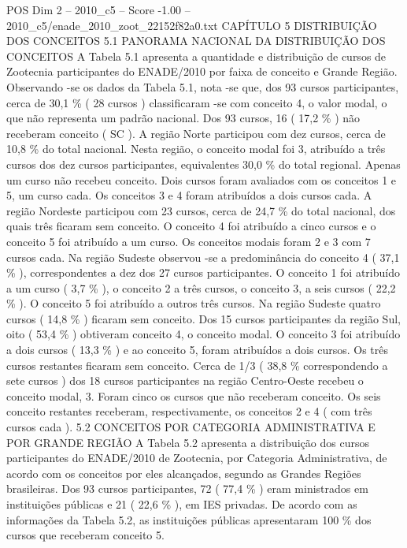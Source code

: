 \begin{textsample}{POS Dim 2 – 2010\_c5 – Score -1.00 – 2010\_c5/enade\_2010\_zoot\_22152f82a0.txt}  \label{ex:f2_pos_327}
CAPÍTULO 5 DISTRIBUIÇÃO DOS CONCEITOS 5.1 PANORAMA NACIONAL DA DISTRIBUIÇÃO DOS CONCEITOS A Tabela 5.1 apresenta a quantidade e distribuição de cursos de Zootecnia participantes do ENADE/2010 por faixa de conceito e Grande Região.
Observando -se os dados da Tabela 5.1, nota -se que, dos 93 cursos participantes, cerca de 30,1 \% ( 28 cursos ) classificaram -se com conceito 4, o valor modal, o que não representa um padrão nacional.
Dos 93 cursos, 16 ( 17,2 \% ) não receberam conceito ( SC ).
A região Norte participou com dez cursos, cerca de 10,8 \% do total nacional.
Nesta região, o conceito modal foi 3, atribuído a três cursos dos dez cursos participantes, equivalentes 30,0 \% do total regional.
Apenas um curso não recebeu conceito.
Dois cursos foram avaliados com os conceitos 1 e 5, um curso cada.
Os conceitos 3 e 4 foram atribuídos a dois cursos cada.
A região Nordeste participou com 23 cursos, cerca de 24,7 \% do total nacional, dos quais três ficaram sem conceito.
O conceito 4 foi atribuído a cinco cursos e o conceito 5 foi atribuído a um curso.
Os conceitos modais foram 2 e 3 com 7 cursos cada.
Na região Sudeste observou -se a predominância do conceito 4 ( 37,1 \% ), correspondentes a dez dos 27 cursos participantes.
O conceito 1 foi atribuído a um curso ( 3,7 \% ), o conceito 2 a três cursos, o conceito 3, a seis cursos ( 22,2 \% ).
O conceito 5 foi atribuído a outros três cursos.
Na região Sudeste quatro cursos ( 14,8 \% ) ficaram sem conceito.
Dos 15 cursos participantes da região Sul, oito ( 53,4 \% ) obtiveram conceito 4, o conceito modal.
O conceito 3 foi atribuído a dois cursos ( 13,3 \% ) e ao conceito 5, foram atribuídos a dois cursos.
Os três cursos restantes ficaram sem conceito.
Cerca de 1/3 ( 38,8 \% correspondendo a sete cursos ) dos 18 cursos participantes na região Centro-Oeste recebeu o conceito modal, 3.
Foram cinco os cursos que não receberam conceito.
Os seis conceito restantes receberam, respectivamente, os conceitos 2 e 4 ( com três cursos cada ). 5.2 CONCEITOS POR CATEGORIA ADMINISTRATIVA E POR GRANDE REGIÃO A Tabela 5.2 apresenta a distribuição dos cursos participantes do ENADE/2010 de Zootecnia, por Categoria Administrativa, de acordo com os conceitos por eles alcançados, segundo as Grandes Regiões brasileiras.
Dos 93 cursos participantes, 72 ( 77,4 \% ) eram ministrados em instituições públicas e 21 ( 22,6 \% ), em IES privadas.
De acordo com as informações da Tabela 5.2, as instituições públicas apresentaram 100 \% dos cursos que receberam conceito 5.

\end{textsample}
